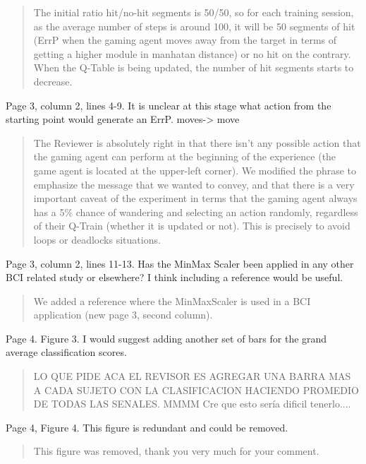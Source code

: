 \documentclass[journal,onecolumn,12pt]{IEEEtran}
\begin{document}
\begin{quotation}
{\color{blue}
The initial ratio hit/no-hit segments is 50/50, so for each training session, as the average number of steps is around 100, it will be 50 segments of hit (ErrP when the gaming agent moves away from the target in terms of getting a higher module in manhatan distance) or no hit on the contrary.
When the Q-Table is being updated, the number of hit segments starts to decrease.
}
\end{quotation}


Page 3, column 2, lines 4-9. It is unclear at this stage what action from the starting point would generate an ErrP.
moves-> move

\begin{quotation}
{\color{blue}
The Reviewer is absolutely right in that there isn't any possible action that the gaming agent can perform at the beginning of the experience (the game agent is located at the upper-left corner).  We modified the phrase to emphasize the message that we wanted to convey, and that there is a very important caveat of the experiment in terms that the gaming agent always has a 5\% chance of wandering and selecting an action randomly, regardless of their Q-Train (whether it is updated or not).  This is precisely to avoid loops or deadlocks situations.
}
\end{quotation}


Page 3, column 2, lines 11-13. Has the MinMax Scaler been applied in any other BCI related study or elsewhere? I think including a reference would be useful.

\begin{quotation}
{\color{blue}
We added a reference where the MinMaxScaler is used in a BCI application (new page 3, second column).
}
\end{quotation}

Page 4. Figure 3. I would suggest adding another set of bars for the grand average classification scores.

\begin{quotation}
{\color{blue}
LO QUE PIDE ACA EL REVISOR ES AGREGAR UNA BARRA MAS A CADA SUJETO CON LA CLASIFICACION HACIENDO PROMEDIO DE TODAS LAS SENALES.  MMMM Cre que esto sería dificil tenerlo....
}
\end{quotation}

Page 4, Figure 4. This figure is redundant and could be removed.

\begin{quotation}
{\color{blue}
This figure was removed, thank you very much for your comment.
}
\end{quotation}
\end{document}
